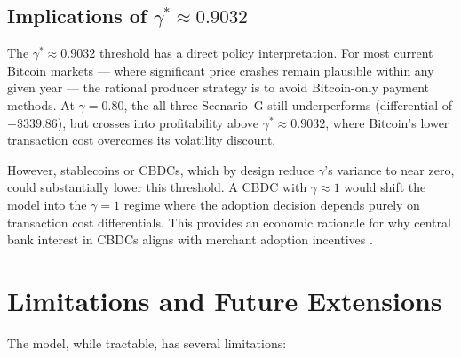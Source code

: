 \documentclass{article}
\begin{document}
\subsection{Implications of $\gamma^* \approx 0.9032$}

The $\gamma^* \approx 0.9032$ threshold has a direct policy interpretation.
For most current Bitcoin markets --- where significant price crashes remain
plausible within any given year --- the rational producer strategy is to avoid
Bitcoin-only payment methods.
At $\gamma = 0.80$, the all-three Scenario~G still underperforms
(differential of $-\$339.86$), but crosses into profitability above
$\gamma^* \approx 0.9032$, where Bitcoin's lower transaction cost overcomes
its volatility discount.

However, stablecoins or CBDCs, which by design reduce $\gamma$'s variance to
near zero, could substantially lower this threshold.
A CBDC with $\gamma \approx 1$ would shift the model into the $\gamma = 1$
regime where the adoption decision depends purely on transaction cost
differentials.
This provides an economic rationale for why central bank interest in CBDCs
aligns with merchant adoption incentives \citep{bis2023}.

\section{Limitations and Future Extensions}
\label{sec:limitations}

The model, while tractable, has several limitations:
\end{document}
